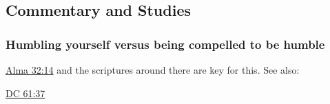 	
	
	
\subsection{Commentary and Studies} %
	\label{HUMILITY-COMMENTARY}

	
		
	\subsubsection{Humbling yourself versus being compelled to be humble}
		\label{HUMILITY-yourself}
		
		\hyperref[ALMA-32-14]{Alma 32:14} and the scriptures around there are key for this. See also:
		
			\begin{compactitem}
				\item \hyperref[DC61-37]{DC 61:37}
			\end{compactitem}